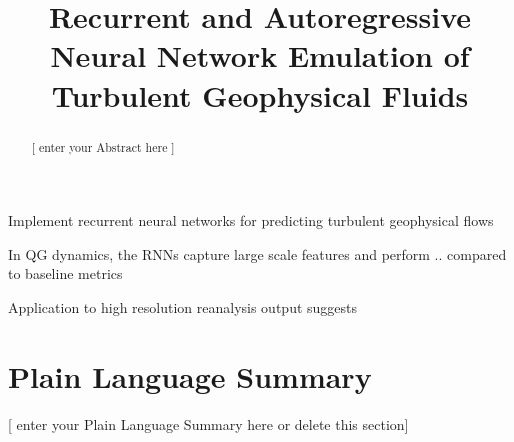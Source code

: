 \documentclass[draft]{agujournal2019}
\begin{document}
\title{Recurrent and Autoregressive Neural Network Emulation of Turbulent Geophysical Fluids}

%
%





\begin{keypoints}
    \item Implement recurrent neural networks for predicting turbulent geophysical flows
    \item In QG dynamics, the RNNs capture large scale features and perform .. compared to baseline metrics
    \item Application to high resolution reanalysis output suggests
\end{keypoints}

%
%

\begin{abstract}
[ enter your Abstract here ]
\end{abstract}

\section*{Plain Language Summary}
[ enter your Plain Language Summary here or delete this section]
\end{document}
